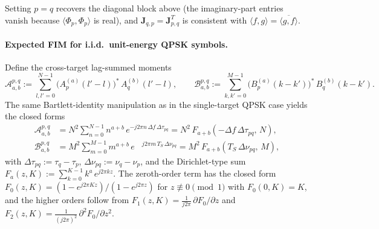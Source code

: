 \documentclass[11pt]{article}
\begin{document}
Setting \(p=q\) recovers the diagonal block above (the imaginary-part
entries vanish because \(\langle \Phi_p,\Phi_p\rangle\) is real), and
\(\bm{J}_{q,p} = \bm{J}_{p,q}^T\) is consistent with
\(\langle f,g\rangle = \overline{\langle g,f\rangle}\).

\paragraph{Expected FIM for i.i.d.\ unit-energy QPSK symbols.} Define the
cross-target lag-summed moments
\begin{equation}
    \mathcal{A}_{a,b}^{p,q} := \sum_{l,l'=0}^{N-1}
        \bigl(A_p^{(a)}(l'-l)\bigr)^*\, A_q^{(b)}(l'-l),
    \qquad
    \mathcal{B}_{a,b}^{p,q} := \sum_{k,k'=0}^{M-1}
        \bigl(B_p^{(a)}(k-k')\bigr)^*\, B_q^{(b)}(k-k').
\end{equation}
The same Bartlett-identity manipulation as in the single-target QPSK
case yields the closed forms
\begin{align}
    \mathcal{A}_{a,b}^{p,q} &= N^2 \sum_{n=0}^{N-1} n^{a+b}\,
        e^{-j2\pi n\,\Delta f\,\Delta\tau_{pq}} = N^2\, F_{a+b}\!\left(-\Delta f\,\Delta\tau_{pq},\, N\right), \\
    \mathcal{B}_{a,b}^{p,q} &= M^2 \sum_{m=0}^{M-1} m^{a+b}\,
        e^{\phantom{-}j2\pi m\, T_S\,\Delta\nu_{pq}} = M^2\, F_{a+b}\!\left(T_S\,\Delta\nu_{pq},\, M\right),
\end{align}
with \(\Delta\tau_{pq} := \tau_q - \tau_p\),
\(\Delta\nu_{pq} := \nu_q - \nu_p\), and the Dirichlet-type sum
\(F_a(z,K) := \sum_{k=0}^{K-1} k^a\, e^{j2\pi k z}\). The
zeroth-order term has the closed form
\(F_0(z,K) = (1-e^{j2\pi K z})/(1-e^{j2\pi z})\) for
\(z\not\equiv 0\pmod 1\) with \(F_0(0,K) = K\), and the higher orders
follow from \(F_1(z,K) = \tfrac{1}{j2\pi}\,\partial F_0/\partial z\) and
\(F_2(z,K) = \tfrac{1}{(j2\pi)^2}\,\partial^2 F_0/\partial z^2\).
\end{document}
